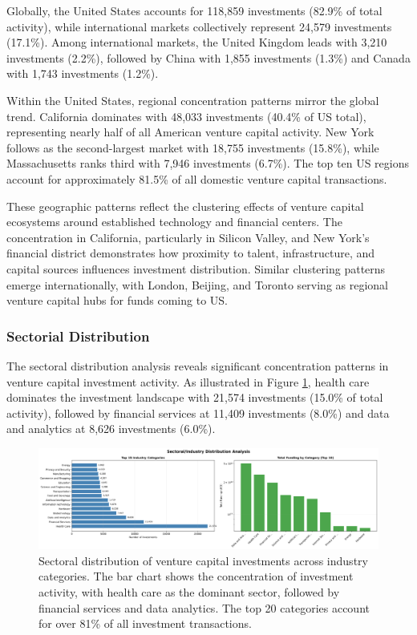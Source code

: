 Globally, the United States accounts for 118,859 investments (82.9\% of total activity), while international markets collectively represent 24,579 investments (17.1\%). Among international markets, the United Kingdom leads with 3,210 investments (2.2\%), followed by China with 1,855 investments (1.3\%) and Canada with 1,743 investments (1.2\%).

Within the United States, regional concentration patterns mirror the global trend. California dominates with 48,033 investments (40.4\% of US total), representing nearly half of all American venture capital activity. New York follows as the second-largest market with 18,755 investments (15.8\%), while Massachusetts ranks third with 7,946 investments (6.7\%). The top ten US regions account for approximately 81.5\% of all domestic venture capital transactions.

These geographic patterns reflect the clustering effects of venture capital ecosystems around established technology and financial centers. The concentration in California, particularly in Silicon Valley, and New York's financial district demonstrates how proximity to talent, infrastructure, and capital sources influences investment distribution. Similar clustering patterns emerge internationally, with London, Beijing, and Toronto serving as regional venture capital hubs for funds coming to US.

\subsubsection{Sectorial Distribution}

The sectoral distribution analysis reveals significant concentration patterns in venture capital investment activity. As illustrated in Figure \ref{fig:sectoral_industry_bars}, health care dominates the investment landscape with 21,574 investments (15.0\% of total activity), followed by financial services at 11,409 investments (8.0\%) and data and analytics at 8,626 investments (6.0\%).

\begin{figure}[htbp]
\centering
\includegraphics[width=1\textwidth]{../figures/us/sectoral_industry_analysis_bars.png}
\caption{Sectoral distribution of venture capital investments across industry categories. The bar chart shows the concentration of investment activity, with health care as the dominant sector, followed by financial services and data analytics. The top 20 categories account for over 81\% of all investment transactions.}
\label{fig:sectoral_industry_bars}
\end{figure}

